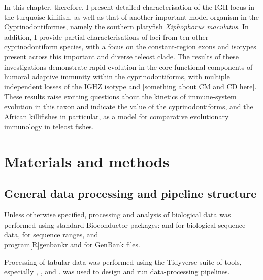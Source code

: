In this chapter, therefore, I present detailed characterisation of the IGH locus in the turquoise killifish, as well as that of another important model organism in the Cyprinodontiformes, namely the southern platyfish \textit{Xiphophorus maculatus}. In addition, I provide partial characterisations of loci from ten other cyprinodontiform species, with a focus on the constant-region exons and isotypes present across this important and diverse teleost clade. The results of these investigations demonstrate rapid evolution in the core functional components of humoral adaptive immunity within the cyprinodontiforms, with multiple independent losses of the IGHZ isotype and [something about CM and CD here]. These results raise exciting questions about the kinetics of immune-system evolution in this taxon and indicate the value of the cyprinodontiforms, and the African killifishes in particular, as a model for comparative evolutionary immunology in teleost fishes. 

\section{Materials and methods} %

\subsection{General data processing and pipeline structure}

Unless otherwise specified, processing and analysis of biological data was performed using standard Bioconductor \parencite{huber2015bioconductor} packages:  \parencite{pages2017biostrings} and  \parencite{pages2018bsgenome} for biological sequence data,  \parencite{lawrence2013genomicranges} for sequence ranges, and \\program[R]{genbankr} \parencite{becker2018genbankr} and  \parencite{winter2017rentrez} for GenBank files.

Processing of tabular data was performed using the Tidyverse suite of tools, especially  \parencite{wickham2018readr},  \parencite{wickham2018dplyr},  \parencite{wickham2018tidyr} and  \parencite{wickham2018stringr}.  \parencite{koster2012snakemake} was used to design and run data-processing pipelines.

